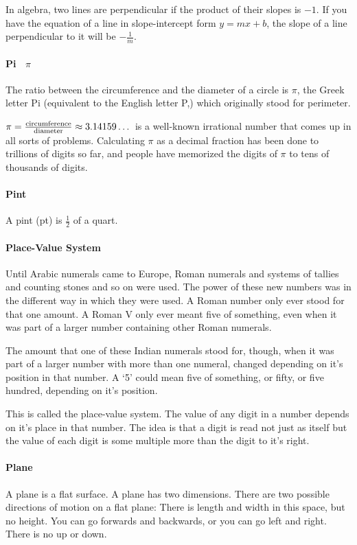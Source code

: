 \documentclass[12pt]{article}
\begin{document}
{In algebra, two lines are perpendicular if the product of their slopes is \(-1\). If you have the equation of a line in slope-intercept form \(y = mx + b\), the slope of a line perpendicular to it will be \(-\frac{1}{m}\).

\paragraph{Pi \ \Large{$\pi$}}
The ratio between the circumference and the diameter of a circle is $\pi$, the Greek letter Pi (equivalent to the English letter P,) which originally stood for perimeter.

$\Large{\pi} = \frac{\text{circumference}}{\text{diameter}}\approx3.14159\dots$ is a well-known irrational number that comes up in all sorts of problems. Calculating $\pi$ as a decimal fraction has been done to trillions of digits so far, and people have memorized the digits of $\pi$ to tens of thousands of digits.

\paragraph{Pint}
A pint (pt) is $\frac{1}{2}$ of a quart.

\paragraph{Place-Value System}
Until Arabic numerals came to Europe, Roman numerals and systems of tallies and counting stones and so on were used. The power of these new numbers was in the different way in which they were used. A Roman number only ever stood for that one amount. A Roman V only ever meant five of something, even when it was part of a larger number containing other Roman numerals.

The amount that one of these Indian numerals stood for, though, when it was part of a larger number with more than one numeral, changed depending on it’s position in that number. A ‘5’ could mean five of something, or fifty, or five hundred, depending on it’s position.

This is called the place-value system. The value of any digit in a number depends on it’s place in that number. The idea is that a digit is read not just as itself but the value of each digit is some multiple more than the digit to it’s right.

\paragraph{Plane}
A plane is a flat surface. A plane has two dimensions. There are two possible directions of motion on a flat plane: There is length and width in this space, but no height. You can go forwards and backwards, or you can go left and right. There is no up or down.
\begin{center}
\end{center}}
\end{document}
